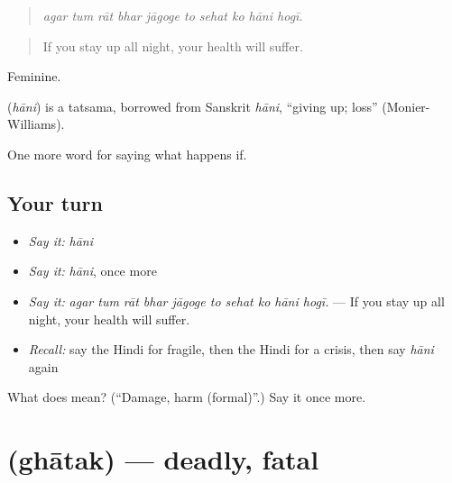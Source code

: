 \begin{quote}
         
\end{quote}

\begin{quote}
\emph{agar tum rāt bhar jāgoge to sehat ko hāni hogī.}
\end{quote}

\begin{quote}
If you stay up all night, your health will suffer.
\end{quote}

Feminine.

\begin{cousinweb}
\textbf{} (\emph{hāni}) is a tatsama, borrowed from Sanskrit \emph{hāni}, \textquotedblleft{}giving up; loss\textquotedblright{} (Monier-Williams).
\end{cousinweb}

\begin{grammarlens}[title={What you've built}]
One more word for saying what happens if.
\end{grammarlens}

\subsection*{Your turn}
\begin{itemize}
\raggedright
  \item \emph{Say it:} \emph{hāni}
  \item \emph{Say it:} \emph{hāni}, once more
  \item \emph{Say it:} \emph{agar tum rāt bhar jāgoge to sehat ko hāni hogī.} — If you stay up all night, your health will suffer.
  \item \emph{Recall:} say the Hindi for fragile, then the Hindi for a crisis, then say \emph{hāni} again
\end{itemize}

\begin{tcolorbox}[breakable,colback=teal!4,colframe=teal!35!black,title={Before you move on}]
What does  mean? (\textquotedblleft{}Damage, harm (formal)\textquotedblright{}.) Say it once more.
\end{tcolorbox}
\section[\texorpdfstring{\hi{घातक} (ghātak)}{घातक (ghātak)}]{ (ghātak) — deadly, fatal}

